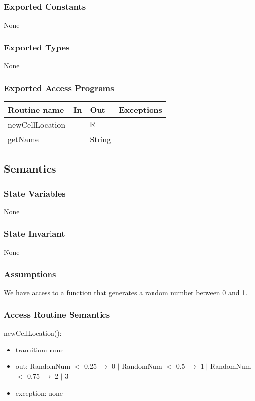 \documentclass[12pt]{article}
\begin{document}
\subsubsection* {Exported Constants}

None

\subsubsection* {Exported Types}

None

\subsubsection* {Exported Access Programs}

\begin{tabular}{| l | l | l | p{5cm} |}
\hline
\textbf{Routine name} & \textbf{In} & \textbf{Out} & \textbf{Exceptions}\\
\hline
newCellLocation & ~ & $\mathbb{R}$ & \\
\hline
getName & & String & ~\\
\hline

\end{tabular}

\subsection* {Semantics}

\subsubsection* {State Variables}

None

\subsubsection* {State Invariant}

None

\subsubsection* {Assumptions}

We have access to a function that generates a random number between 0 and 1.

\subsubsection* {Access Routine Semantics}
newCellLocation(): 
\begin{itemize}
    \item transition: none
    \item out: RandomNum $<$ 0.25 $\rightarrow$ 0 $|$ RandomNum $<$ 0.5 $\rightarrow$ 1 $|$ RandomNum $<$ 0.75 $\rightarrow$ 2 $|$ 3
    \item exception: none
\end{itemize}
\end{document}
